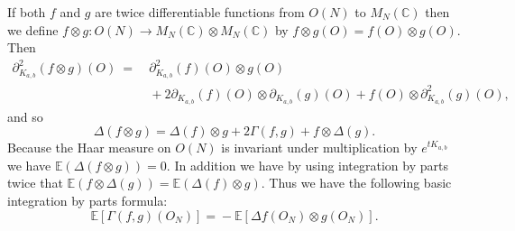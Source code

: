 \documentclass[11pt]{amsart}
\theoremstyle{definition}
\numberwithin{theorem}{section}
\newcommand{\bC}{\mathbb{C}}
\begin{document}
If both $f$ and $g$ are twice differentiable functions from
$O(N)$ to $M_N(\bC)$ then we define $f \otimes g: O(N) \to
M_N(\bC) \otimes M_N(\bC)$ by $f\otimes g(O) = f(O) \otimes
g(O)$. Then
\begin{align*} 
\partial^2_{K_{a, b}}(f \otimes g)(O)
\mbox{}\ = \ \mbox{} & 
\partial^2_{K_{a, b}}(f)(O) \otimes g(O)   \\
& \mbox{}+ 
2 \partial_{K_{a, b}}(f)(O) \otimes \partial_{K_{a, b}}(g)(O) + f(O) \otimes \partial^2_{K_{a, b}}(g)(O),
\end{align*}
and so
\[
\Delta(f\otimes g)=\Delta(f)\otimes g+2\Gamma(f,g)+f\otimes \Delta(g).
\]
Because the Haar measure on $O(N)$ is invariant under
multiplication by $e^{tK_{a, b}}$ we have
$\mathbb{E}(\Delta(f \otimes g)) = 0$. In addition we have
by using integration by parts twice that $\mathbb{E}(f
\otimes \Delta(g)) = \mathbb{E}(\Delta(f) \otimes g)$. Thus
we have the following basic integration by parts formula:
\begin{equation}
\mathbb{E}[\Gamma(f,g)(O_N)]
= \mbox{} -
\mathbb{E}[\Delta f(O_N)\otimes g(O_N)].\label{intbypart}
\end{equation}
\end{document}
